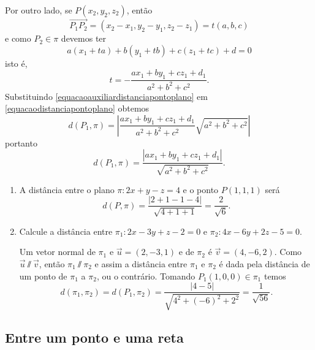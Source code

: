 Por outro lado, se $P(x_2, y_2, z_2)$, ent\~ao
\[
    \vec{P_1P_2} = (x_2 - x_1, y_2 - y_1, z_2 - z_1) = t(a,b,c)
\]
e como $P_2 \in \pi$ devemos ter
\[
    a(x_1 + ta) + b(y_1 + tb) + c(z_1 + tc) + d = 0
\]
isto \'e,
\begin{equation}\label{equacaoauxiliardistanciapontoplano}
    t = -\dfrac{ax_1 + by_1 + cz_1 + d_1}{a^2 + b^2 + c^2}.
\end{equation}
Substituindo \eqref{equacaoauxiliardistanciapontoplano} em \eqref{equacaodistanciapontoplano} obtemos
\[
    d(P_1,\pi) = \left|\dfrac{ax_1 + by_1 + cz_1 + d_1}{a^2 + b^2 + c^2}\sqrt{a^2 + b^2 + c^2}\right|
\]
portanto
\[
    d(P_1,\pi) = \dfrac{|ax_1 + by_1 + cz_1 + d_1|}{\sqrt{a^2 + b^2 + c^2}}.
\]

\begin{exemplos}
    \begin{enumerate}
        \item A dist\^ancia entre o plano $\pi: 2x + y - z = 4$ e o ponto $P(1,1,1)$ ser\'a
        \[
            d(P,\pi) = \dfrac{|2 + 1 - 1 - 4|}{\sqrt{4 + 1 + 1}} = \dfrac{2}{\sqrt{6}}.
        \]
        \item Calcule a dist\^ancia entre $\pi_1 : 2x - 3y + z - 2 = 0$ e $\pi_2 : 4x - 6y + 2z - 5 = 0$.
        \begin{solucao}
            Um vetor normal de $\pi_1$ e $\vec{u} = (2,-3,1)$ e de $\pi_2$ \'e $\vec{v} = (4,-6,2)$. Como $\vec{u}\varparallel\vec{v}$, ent\~ao $\pi_1\varparallel\pi_2$ e assim a dist\^ancia entre $\pi_1$ e $\pi_2$ \'e dada pela dist\^ancia de um ponto de $\pi_1$ a $\pi_2$, ou o contr\'ario. Tomando $P_1(1,0,0)\in\pi_1$ temos
            \[
                d(\pi_1,\pi_2) = d(P_1,\pi_2) = \dfrac{|4-5|}{\sqrt{4^2 + (-6)^2 + 2^2}} = \dfrac{1}{\sqrt{56}}.
            \]
        \end{solucao}
    \end{enumerate}
\end{exemplos}


\subsection{Entre um ponto e uma reta} %
\label{sub:entre_um_ponto_e_uma_reta}

